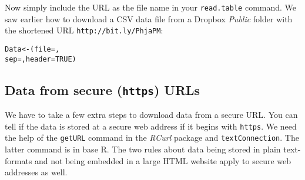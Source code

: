 Now simply include the URL as the file name in your \texttt{read.table} command. We saw earlier how to download a CSV data file from a Dropbox \emph{Public} folder with the shortened URL \texttt{http://bit.ly/PhjaPM}:

\begin{knitrout}
\color{fgcolor}\begin{kframe}
\begin{alltt}
Data <- (file = , 
                    sep = , header = TRUE)
\end{alltt}
\end{kframe}
\end{knitrout}


\subsection{Data from secure ({\tt{https}}) URLs}

We have to take a few extra steps to download data from a secure URL. You can tell if the data is stored at a secure web address if it begins with \texttt{https}. We need the help of the \texttt{getURL} command in the {\emph{RCurl}} package \cite[]{R-RCurl} and \texttt{textConnection}. The latter command is in base R. The two rules about data being stored in plain text-formats and not being embedded in a large HTML website apply to secure web addresses as well.

